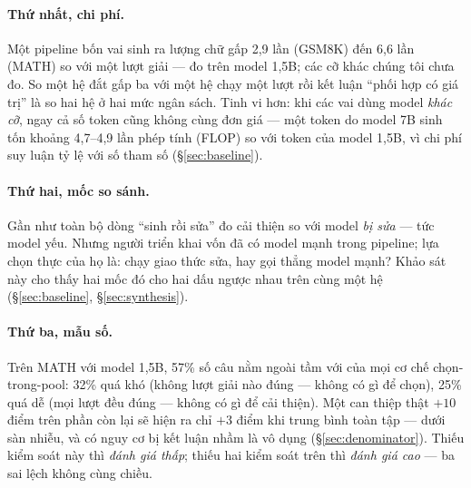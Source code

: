 \documentclass[12pt,a4paper]{article}
\begin{document}
\paragraph{Thứ nhất, chi phí.} Một pipeline bốn vai sinh ra lượng chữ gấp 2,9 lần (GSM8K) đến
6,6 lần (MATH) so với một lượt giải --- đo trên model 1,5B; các cỡ khác chúng tôi chưa đo. So
một hệ đắt gấp ba với một hệ chạy một lượt rồi kết luận ``phối hợp có giá trị'' là so hai hệ ở
hai mức ngân sách. Tinh vi hơn: khi các vai dùng model \emph{khác cỡ}, ngay cả số token cũng
không cùng đơn giá --- một token do model 7B sinh tốn khoảng 4,7--4,9 lần phép tính (FLOP) so
với token của model 1,5B, vì chi phí suy luận tỷ lệ với số tham số \cite{kaplan2020}
(\S\ref{sec:baseline}).

\paragraph{Thứ hai, mốc so sánh.} Gần như toàn bộ dòng ``sinh rồi sửa'' đo cải thiện so với
model \emph{bị sửa} --- tức model yếu. Nhưng người triển khai vốn đã có model mạnh trong
pipeline; lựa chọn thực của họ là: chạy giao thức sửa, hay gọi thẳng model mạnh? Khảo sát này
cho thấy hai mốc đó cho hai dấu ngược nhau trên cùng một hệ (\S\ref{sec:baseline},
\S\ref{sec:synthesis}).

\paragraph{Thứ ba, mẫu số.} Trên MATH với model 1,5B, 57\% số câu nằm ngoài tầm với của mọi cơ
chế chọn-trong-pool: 32\% quá khó (không lượt giải nào đúng --- không có gì để chọn), 25\% quá
dễ (mọi lượt đều đúng --- không có gì để cải thiện). Một can thiệp thật $+10$ điểm trên phần
còn lại sẽ hiện ra chỉ $+3$ điểm khi trung bình toàn tập --- dưới sàn nhiễu, và có nguy cơ bị
kết luận nhầm là vô dụng (\S\ref{sec:denominator}). Thiếu kiểm soát này thì \emph{đánh giá
thấp}; thiếu hai kiểm soát trên thì \emph{đánh giá cao} --- ba sai lệch không cùng chiều.
\end{document}
